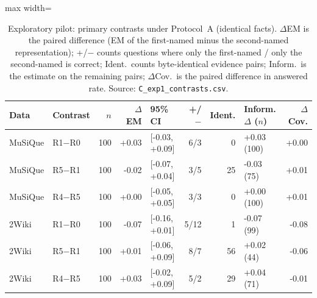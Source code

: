 \begin{table}[t]
\centering
\small
\begin{adjustbox}{max width=\linewidth}
\begin{tabular}{@{}llrrlrrlr@{}}
\toprule
Data & Contrast & $n$ & $\Delta$EM & 95\% CI & +/$-$ & Ident. & Inform. $\Delta$ ($n$) & $\Delta$Cov. \\
\midrule
MuSiQue & R1$-$R0 & 100 & +0.03 & [-0.03, +0.09] & 6/3 & 0 & +0.03 (100) & +0.00 \\
MuSiQue & R5$-$R1 & 100 & -0.02 & [-0.07, +0.04] & 3/5 & 25 & -0.03 (75) & +0.01 \\
MuSiQue & R4$-$R5 & 100 & +0.00 & [-0.05, +0.05] & 3/3 & 0 & +0.00 (100) & +0.01 \\
2Wiki & R1$-$R0 & 100 & -0.07 & [-0.16, +0.01] & 5/12 & 1 & -0.07 (99) & -0.08 \\
2Wiki & R5$-$R1 & 100 & +0.01 & [-0.06, +0.09] & 8/7 & 56 & +0.02 (44) & -0.06 \\
2Wiki & R4$-$R5 & 100 & +0.03 & [-0.02, +0.09] & 5/2 & 29 & +0.04 (71) & -0.01 \\
\bottomrule
\end{tabular}
\end{adjustbox}
\caption{Exploratory pilot: primary contrasts under Protocol~A (identical facts). $\Delta$EM is the paired difference (EM of the first-named minus the second-named representation); +/$-$ counts questions where only the first-named / only the second-named is correct; Ident.\ counts byte-identical evidence pairs; Inform.\ is the estimate on the remaining pairs; $\Delta$Cov.\ is the paired difference in answered rate. Source: \texttt{C\_exp1\_contrasts.csv}.}
\label{tab:pilot-primary}
\end{table}
